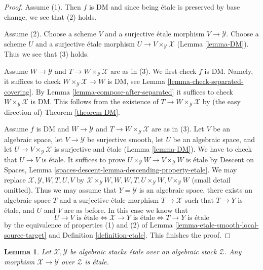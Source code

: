 \documentclass{stacks-project}
\theoremstyle{plain}
\newtheorem{lemma}[subsection]{Lemma}
\theoremstyle{definition}
\theoremstyle{remark}
\numberwithin{equation}{subsection}
\begin{document}
\begin{proof}
Assume (1). Then $f$ is DM and since being \'etale is preserved
by base change, we see that (2) holds.

\medskip\noindent
Assume (2). Choose a scheme $V$ and a surjective \'etale morphism
$V \to \mathcal{Y}$. Choose a scheme $U$ and a surjective \'etale morphism
$U \to V \times_\mathcal{Y} \mathcal{X}$ (Lemma \ref{lemma-DM}).
Thus we see that (3) holds.

\medskip\noindent
Assume $W \to \mathcal{Y}$ and $T \to W \times_\mathcal{Y} \mathcal{X}$
are as in (3). We first check $f$ is DM. Namely, it suffices to check
$W \times_\mathcal{Y} \mathcal{X} \to W$ is DM, see
Lemma \ref{lemma-check-separated-covering}.
By Lemma \ref{lemma-compose-after-separated}
it suffices to check $W \times_\mathcal{Y} \mathcal{X}$ is DM.
This follows from the existence of $T \to W \times_\mathcal{Y} \mathcal{X}$
by (the easy direction of) Theorem \ref{theorem-DM}.

\medskip\noindent
Assume $f$ is DM and $W \to \mathcal{Y}$ and
$T \to W \times_\mathcal{Y} \mathcal{X}$ are as in (3).
Let $V$ be an algebraic space, let $V \to \mathcal{Y}$ be surjective smooth,
let $U$ be an algebraic space, and let
$U \to V \times_\mathcal{Y} \mathcal{X}$ is surjective and \'etale
(Lemma \ref{lemma-DM}). We have to check that $U \to V$ is \'etale.
It suffices to prove $U \times_\mathcal{Y} W \to V \times_\mathcal{Y} W$
is \'etale by Descent on Spaces, Lemma
\ref{spaces-descent-lemma-descending-property-etale}.
We may replace $\mathcal{X}, \mathcal{Y}, W, T, U, V$ by
$\mathcal{X} \times_\mathcal{Y} W, W, W, T, U \times_\mathcal{Y} W,
V \times_\mathcal{Y} W$ (small detail omitted).
Thus we may assume that $Y = \mathcal{Y}$ is an algebraic space, there exists
an algebraic space $T$ and a surjective \'etale morphism
$T \to \mathcal{X}$ such that $T \to Y$ is \'etale, and $U$ and $V$
are as before. In this case we know that
$$
U \to V\text{ is \'etale}
\Leftrightarrow
\mathcal{X} \to Y\text{ is \'etale}
\Leftrightarrow
T \to Y\text{ is \'etale}
$$
by the equivalence of properties (1) and (2) of
Lemma \ref{lemma-etale-smooth-local-source-target}
and Definition \ref{definition-etale}.
This finishes the proof.
\end{proof}

\begin{lemma}
\label{lemma-etale-permanence}
Let $\mathcal{X}, \mathcal{Y}$ be algebraic stacks \'etale over
an algebraic stack $\mathcal{Z}$. Any morphism
$\mathcal{X} \to \mathcal{Y}$ over $\mathcal{Z}$ is \'etale.
\end{lemma}
\end{document}
